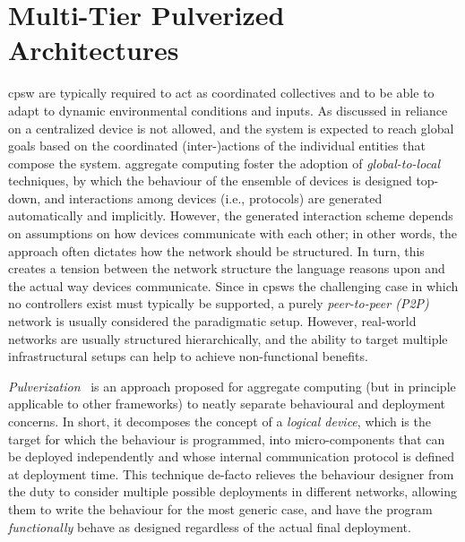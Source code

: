 \chapter{Multi-Tier Pulverized Architectures}\label{chap:eng:multitier}%
\minitoc%
%
\newcommand{\scalaloci}{{ScalaLoci}}
\newcommand{\scafiloci}{{ScaFiLoci}}
\newcommand{\scalainline}[1]{\texttt{#1}}
\ac{cpsw} are typically required 
 to act as coordinated collectives
 and to be able to adapt to dynamic
 environmental conditions and inputs.
%
%
As discussed in  reliance on a centralized device is not allowed,
and the system is expected to reach global goals based 
 on the coordinated (inter-)actions of the individual entities that compose the system.
%
aggregate computing foster the adoption of \emph{global-to-local} techniques,
by which the behaviour of the ensemble of devices is designed top-down,
and interactions among devices (i.e., protocols) are generated automatically and implicitly.
%
However, the generated interaction scheme depends on assumptions on how devices communicate with each other;
in other words, the approach often dictates how the network should be structured.
%
In turn, this creates a tension between the network structure the language reasons upon and the actual way devices communicate.
%
Since in \acp{cpsw} the challenging case in which no controllers exist must typically be supported, a purely \emph{peer-to-peer (P2P)} network is usually considered the paradigmatic setup.
%
However, real-world networks are usually structured hierarchically, and the ability to target multiple infrastructural setups can help to achieve non-functional benefits.

\emph{Pulverization}~\cite{DBLP:journals/fi/CasadeiPPVW20}
is an approach proposed for aggregate computing (but in principle applicable to other frameworks) to neatly separate behavioural and deployment concerns.
%
In short, it decomposes the concept of a \emph{logical device}, which is the target for which the behaviour is programmed,
into micro-components that can be deployed independently
and whose internal communication protocol is defined at deployment time.
%
This technique de-facto relieves the behaviour designer from the duty to consider multiple possible deployments in different networks,
allowing them to write the behaviour for the most generic case, and have the program \emph{functionally} behave as designed regardless of the actual final deployment.

